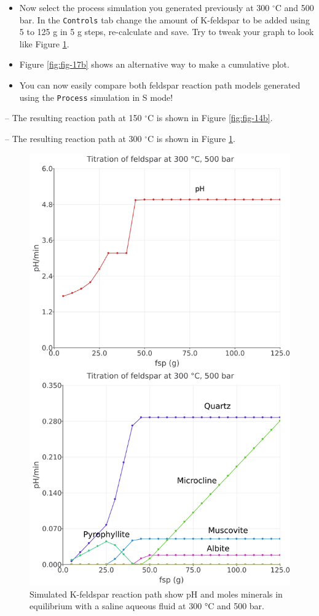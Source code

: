 \documentclass[
]{book}
\begin{document}
\begin{itemize}
\item
  Now select the process simulation you generated previously at 300 \(^\circ\)C and 500 bar. In the \texttt{Controls} tab change the amount of K-feldspar to be added using 5 to 125 g in 5 g steps, re-calculate and save. Try to tweak your graph to look like Figure \ref{fig:fig-16b}.
\item
  Figure \ref{fig:fig-17b} shows an alternative way to make a cumulative plot.
\item
  You can now easily compare both feldspar reaction path models generated using the \texttt{Process} simulation in S mode!
\end{itemize}

-- The resulting reaction path at 150 \(^\circ\)C is shown in Figure \ref{fig:fig-14b}.

-- The resulting reaction path at 300 \(^\circ\)C is shown in Figure \ref{fig:fig-16b}.

\begin{figure}
\includegraphics[width=0.8\linewidth]{figures/module2/fig-16} \caption{Simulated K-feldspar reaction path show pH and moles minerals in equilibrium with a saline aqueous fluid at 300 °C and 500 bar.}\label{fig:fig-16b}
\end{figure}
\end{document}

